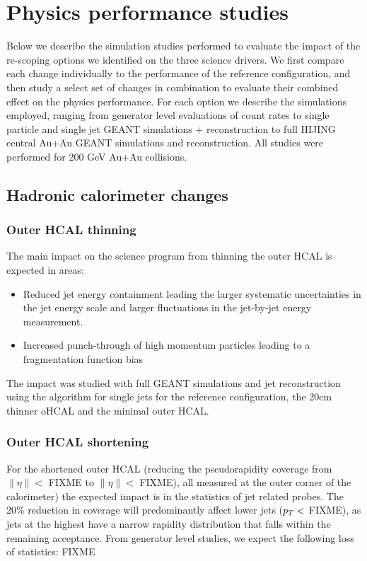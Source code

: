 
\chapter{Physics performance studies}
\label{cha:performance}

Below we describe the simulation studies performed to evaluate the impact of the re-scoping options we identified on the three 
science drivers. We  first compare each change individually to the performance of the reference configuration, and then study
a select set of changes in combination to evaluate their combined effect on the physics performance. For each option we 
describe the simulations employed, ranging from generator level evaluations of count rates to single particle and single jet
GEANT simulations + reconstruction to full HIJING central Au+Au GEANT simulations and reconstruction. All studies were 
performed for 200 GeV Au+Au collisions.
\section{Hadronic calorimeter changes}
\subsection{Outer HCAL thinning}
The main impact on the science program from thinning the outer HCAL is expected in areas:
\begin{itemize} 
\item Reduced jet energy containment leading the larger systematic uncertainties in the jet energy scale and larger fluctuations
in the jet-by-jet energy measurement.
\item Increased punch-through of high momentum particles leading to a fragmentation function bias
\end{itemize}
The impact was studied with full GEANT simulations and jet reconstruction using the \antikt algorithm for single jets 
for the reference configuration, the 20cm thinner oHCAL and the minimal outer HCAL. 
\subsection{Outer HCAL shortening}

For the shortened outer HCAL (reducing the pseudorapidity coverage from $\| \eta \| <$ FIXME to $\| \eta \| < $ FIXME), all measured
at the outer corner of the calorimeter) the expected impact 
is in the statistics of jet related probes. The 20\% reduction in coverage will predominantly affect lower \pt jets ($\mbox{${p_T}$} <$ FIXME),
as jets at the highest \pT have a narrow rapidity distribution that falls within the remaining acceptance. From generator level 
studies, we expect the following loss of statistics: FIXME

